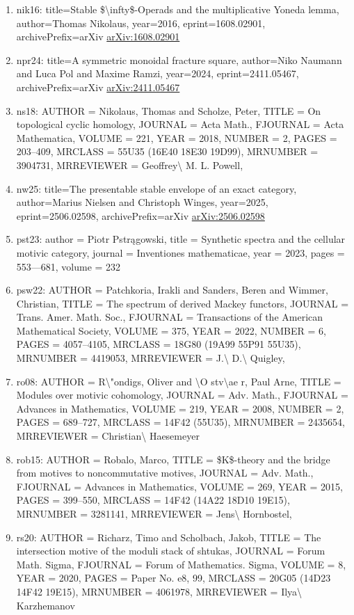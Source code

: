 \documentclass[11pt]{article}
\begin{document}
\begin{enumerate}[leftmargin=*]
  \item nik16: title=Stable \$\textbackslash{}infty\$-Operads and the multiplicative Yoneda lemma, author=Thomas Nikolaus, year=2016, eprint=1608.02901, archivePrefix=arXiv \href{https://arxiv.org/abs/1608.02901}{arXiv:1608.02901}
  \item npr24: title=A symmetric monoidal fracture square, author=Niko Naumann and Luca Pol and Maxime Ramzi, year=2024, eprint=2411.05467, archivePrefix=arXiv \href{https://arxiv.org/abs/2411.05467}{arXiv:2411.05467}
  \item ns18: AUTHOR = Nikolaus, Thomas and Scholze, Peter, TITLE = On topological cyclic homology, JOURNAL = Acta Math., FJOURNAL = Acta Mathematica, VOLUME = 221, YEAR = 2018, NUMBER = 2, PAGES = 203--409, MRCLASS = 55U35 (16E40 18E30 19D99), MRNUMBER = 3904731, MRREVIEWER = Geoffrey\textbackslash{} M. L. Powell,
  \item nw25: title=The presentable stable envelope of an exact category, author=Marius Nielsen and Christoph Winges, year=2025, eprint=2506.02598, archivePrefix=arXiv \href{https://arxiv.org/abs/2506.02598}{arXiv:2506.02598}
  \item pst23: author = Piotr Pstrągowski, title = Synthetic spectra and the cellular motivic category, journal = Inventiones mathematicae, year = 2023, pages = 553---681, volume = 232
  \item psw22: AUTHOR = Patchkoria, Irakli and Sanders, Beren and Wimmer, Christian, TITLE = The spectrum of derived Mackey functors, JOURNAL = Trans. Amer. Math. Soc., FJOURNAL = Transactions of the American Mathematical Society, VOLUME = 375, YEAR = 2022, NUMBER = 6, PAGES = 4057--4105, MRCLASS = 18G80 (19A99 55P91 55U35), MRNUMBER = 4419053, MRREVIEWER = J.\textbackslash{} D.\textbackslash{} Quigley,
  \item ro08: AUTHOR = R\textbackslash{}"ondigs, Oliver and \textbackslash{}O stv\textbackslash{}ae r, Paul Arne, TITLE = Modules over motivic cohomology, JOURNAL = Adv. Math., FJOURNAL = Advances in Mathematics, VOLUME = 219, YEAR = 2008, NUMBER = 2, PAGES = 689--727, MRCLASS = 14F42 (55U35), MRNUMBER = 2435654, MRREVIEWER = Christian\textbackslash{} Haesemeyer
  \item rob15: AUTHOR = Robalo, Marco, TITLE = \$K\$-theory and the bridge from motives to noncommutative motives, JOURNAL = Adv. Math., FJOURNAL = Advances in Mathematics, VOLUME = 269, YEAR = 2015, PAGES = 399--550, MRCLASS = 14F42 (14A22 18D10 19E15), MRNUMBER = 3281141, MRREVIEWER = Jens\textbackslash{} Hornbostel,
  \item rs20: AUTHOR = Richarz, Timo and Scholbach, Jakob, TITLE = The intersection motive of the moduli stack of shtukas, JOURNAL = Forum Math. Sigma, FJOURNAL = Forum of Mathematics. Sigma, VOLUME = 8, YEAR = 2020, PAGES = Paper No. e8, 99, MRCLASS = 20G05 (14D23 14F42 19E15), MRNUMBER = 4061978, MRREVIEWER = Ilya\textbackslash{} Karzhemanov

\end{enumerate}
\end{document}
